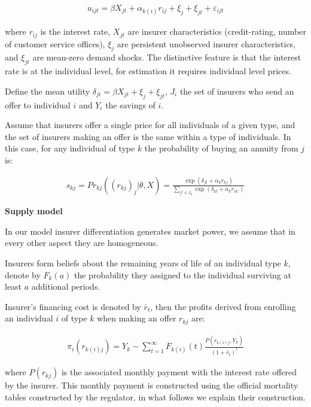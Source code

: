 \documentclass[12pt]{article}
\theoremstyle{plain}
\theoremstyle{plain}
\begin{document}
\begin{align}\label{eq:utility}
   u_{ijt} = \beta X_{jt}+ \alpha_{k(i)} r_{ij} + \xi_j +\xi_{jt} + \varepsilon_{ijt}   
\end{align}

where $r_{ij}$ is the interest rate, $X_{jt}$  are insurer characteristics (credit-rating, number of customer service offices), $\xi_j$ are persistent unobserved insurer characteristics, and  $\xi_{jt}$ are mean-zero demand shocks.  
The distinctive feature is that the interest rate is at the individual level, for estimation it requires individual level prices. 

Define the mean utility $\delta_{jt} = \beta X_{jt} + \xi_j + \xi_{jt}$, $J_i$ the set of insurers who send an offer to individual $i$ and $Y_i$ the savings of $i$. 

 
Assume that insurers offer a single price for all individuals of a given type,  and the set of insurers making an offer is the same within a type of individuals. In this case, for any individual of type $k$ the probability of buying an annuity from $j$ is: 


\begin{align*}
    s_{kj} = Pr_{kj}((r_{kj})_{j}|\theta, X) = \frac{\exp(\delta_{jt} + \alpha_{k}r_{kj})}{\sum_{j'\in J_k}\exp(\delta_{kt} + \alpha_kr_{ik'})}
\end{align*}


\textbf{Supply model}

In our model insurer differentiation generates market power, we assume that in every other aspect they are homogeneous.


Insurers form beliefs about the remaining years of life of an individual type $k$, denote by $F_k(a)$ the probability they assigned to the individual surviving at least $a$ additional periods. 

Insurer's financing cost is denoted by $\bar{r}_t$, then the profits derived from enrolling an individual $i$ of type $k$ when making an offer $r_{kj}$ are: 

\begin{align}\label{eq:individual_profits}
    \pi_{i}(r_{k(i)j}) = Y_k -   \sum_{t=1}^{\infty} F_{k(i)}(t) \frac{P(r_{k(i)j},Y_k)}{(1+\bar{r}_t)^t} 
\end{align}

where $P(r_{kj})$ is the associated monthly payment with the interest rate offered by the insurer. This monthly payment is constructed using the official mortality tables constructed by the regulator, in what follows we explain their construction. 
\end{document}
